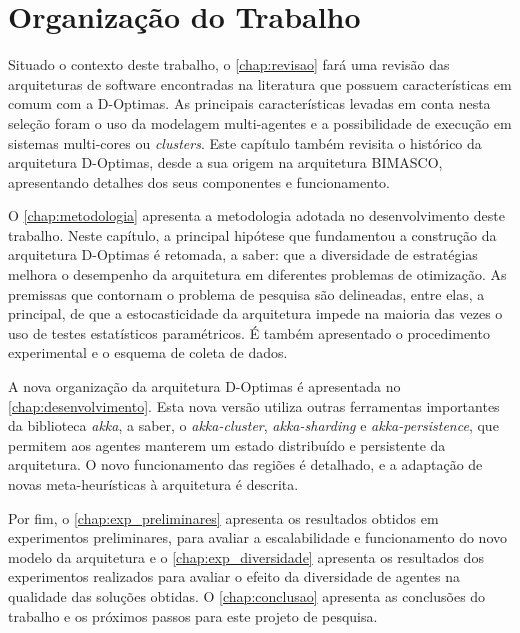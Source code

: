 \section{Organização do Trabalho}

Situado o contexto deste trabalho, o \autoref{chap:revisao} fará uma revisão das arquiteturas de software encontradas na literatura que possuem características em comum com a D-Optimas. As principais características levadas em conta nesta seleção foram o uso da modelagem multi-agentes e a possibilidade de execução em sistemas multi-cores ou \textit{clusters}. Este capítulo também revisita o histórico da arquitetura D-Optimas, desde a sua origem na arquitetura BIMASCO, apresentando detalhes dos seus componentes e funcionamento. 

O \autoref{chap:metodologia} apresenta a metodologia adotada no desenvolvimento deste trabalho. Neste capítulo, a principal hipótese que fundamentou a construção da arquitetura D-Optimas é retomada, a saber: que a diversidade de estratégias melhora o desempenho da arquitetura em diferentes problemas de otimização. As premissas que contornam o problema de pesquisa são delineadas, entre elas, a principal, de que a estocasticidade da arquitetura impede na maioria das vezes o uso de testes estatísticos paramétricos. É também apresentado o procedimento experimental e o esquema de coleta de dados.

A nova organização da arquitetura D-Optimas é apresentada no \autoref{chap:desenvolvimento}. Esta nova versão utiliza outras ferramentas importantes da biblioteca \textit{akka}, a saber, o \textit{akka-cluster}, \textit{akka-sharding} e \textit{akka-persistence}, que permitem aos agentes manterem um estado distribuído e persistente da arquitetura. O novo funcionamento das regiões é detalhado, e a adaptação de novas meta-heurísticas à arquitetura é descrita.

Por fim, o \autoref{chap:exp_preliminares} apresenta os resultados obtidos em experimentos preliminares, para avaliar a escalabilidade e funcionamento do novo modelo da arquitetura e o \autoref{chap:exp_diversidade} apresenta os resultados dos experimentos realizados para avaliar o efeito da diversidade de agentes na qualidade das soluções obtidas. O \autoref{chap:conclusao} apresenta as conclusões do trabalho e os próximos passos para este projeto de pesquisa. 